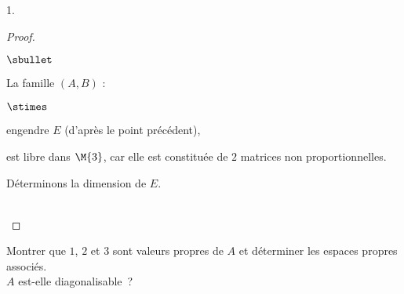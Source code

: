 \documentclass[11pt]{article}%
\begin{document}
\begin{noliste}{1.}
\begin{proof}
\begin{noliste}{$\sbullet$}
    \item La famille $(A,B)$ :
    \begin{noliste}{$\stimes$}
      \item engendre $E$ (d'après le point précédent),
      \item est libre dans $\M{3}$, car elle est constituée de $2$ 
      matrices non proportionnelles.
    \end{noliste}
    
    \item Déterminons la dimension de $E$.
  \end{noliste}
  
  
  ~\\[-1.4cm]
 \end{proof}


 \item Montrer que $1$, $2$ et $3$ sont valeurs propres de $A$ et 
 déterminer les espaces propres associés.\\ 
 $A$ est-elle diagonalisable~?
 

\end{noliste}
\end{document}
